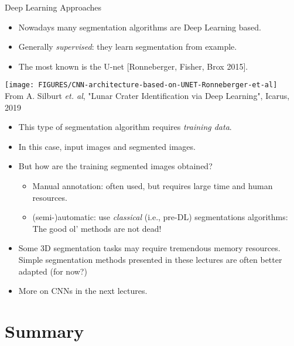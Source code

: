 \documentclass[9pt]{beamer}
\begin{document}
\begin{frame}{Deep Learning Approaches}
	\begin{itemize}
		\item Nowadays many segmentation algorithms are Deep Learning based.
		\item Generally \emph{supervised}: they learn segmentation from example.
		\item The most known is the U-net [Ronneberger, Fisher, Brox 2015]. 
	\end{itemize}
\begin{center}
	\texttt{[image: FIGURES/CNN-architecture-based-on-UNET-Ronneberger-et-al]}\\
	{\tiny From A. Silburt \textit{et. al}, "Lunar Crater Identification via Deep Learning", Icarus, 2019}
\end{center}
\end{frame}


\begin{frame}	
	\begin{itemize}
		\item This type of segmentation algorithm requires \emph{training data}.
		\item In this case, input images and segmented images.
		\item But how are the training segmented images obtained?
		\begin{itemize}
			\item Manual annotation: often used, but requires large time and human resources.
			\item (semi-)automatic: use \emph{classical} (i.e., pre-DL) segmentations algorithms:
			The good ol' methods are not dead!
		\end{itemize}\vfill
		\item Some 3D segmentation tasks may require tremendous memory resources. Simple segmentation methods presented in these lectures are often better adapted (for now?) 
	\end{itemize}
	\vfill
	\begin{itemize}
		\item More on CNNs in the next lectures.
	\end{itemize}
\end{frame}




\section{Summary}
\end{document}
